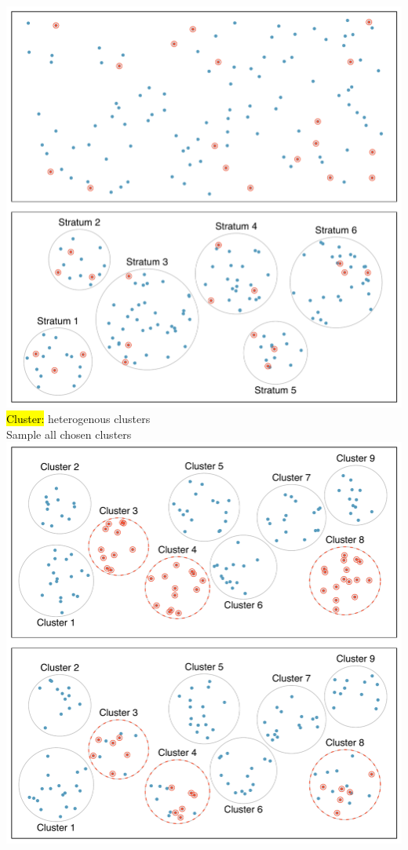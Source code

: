 \documentclass[slidestop,compress,mathserif,12pt,t,professionalfonts,xcolor=table]{beamer}
\begin{document}
\begin{frame}
{\includegraphics[width=\textwidth]{figures/sampling_stratified} 
}
{
\pause
\hl{Cluster:} {\small heterogenous clusters} \\
{\small Sample all chosen clusters}
\includegraphics[width=\textwidth]{figures/sampling_cluster} \\
}
\end{frame}
\end{document}

